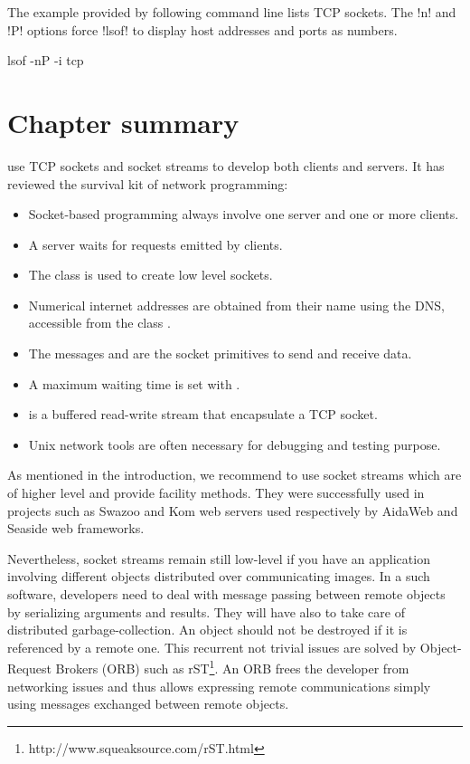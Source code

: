 \documentclass[a4paper,10pt,twoside]{book}
\begin{document}
The example provided by following command line lists TCP sockets.
The \ct!n! and \ct!P! options force \ct!lsof! to display host addresses and ports as numbers. 
\begin{code}{}
lsof -nP -i tcp
\end{code}


\section{Chapter summary}
 use TCP sockets and socket streams to develop both  clients and servers. It has reviewed the survival kit of network programming:

\begin{itemize}
\item Socket-based programming always involve one server and one or more clients.
\item A server waits for requests emitted by clients.
\item The class  is used to create low level sockets.
\item Numerical internet addresses are obtained from their name using the DNS, accessible from the class .
\item The messages  and  are the socket primitives to send and receive data.
\item A maximum waiting time is set with .
\item {} is a buffered read-write stream that encapsulate a TCP socket.
\item Unix network tools are often necessary for debugging and testing purpose.
\end{itemize}

As mentioned in the introduction, we recommend to use socket streams which are of higher level and provide facility methods.
They were successfully used in projects such as Swazoo and Kom web servers used respectively by AidaWeb and Seaside web frameworks.

Nevertheless, socket streams remain still low-level if you have an application involving different objects distributed over communicating images.
In a such software, developers need to deal with message passing between remote objects by serializing arguments and results.
They will have also to take care of distributed garbage-collection.
An object should not be destroyed if it is referenced by a remote one.
This recurrent not trivial issues are solved by Object-Request Brokers (ORB) such as rST\footnote{http://www.squeaksource.com/rST.html}.
An ORB frees the developer from networking issues and thus allows expressing remote communications simply using messages exchanged between remote objects.
\end{document}
